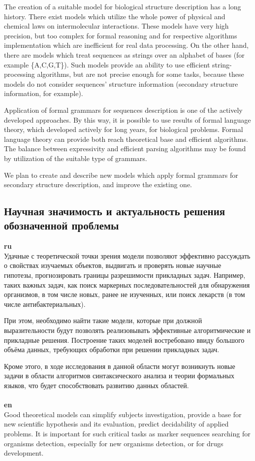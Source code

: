 \documentclass[12pt]{article}  %
\theoremstyle{remark}
\begin{document}
The creation of a suitable model for biological structure description has a long history.
There exist models which utilize the whole power of physical and chemical laws on intermolecular interactions.
These models have very high precision, but too complex for formal reasoning and for respective algorithms implementation which are inefficient for real data processing.
On the other hand, there are models which treat sequences as strings over an alphabet of bases (for example \{A,C,G,T\}).
Such models provide an ability to use efficient string-processing algorithms, but are not precise enough for some tasks, because these models do not consider sequences' structure information (secondary structure information, for example).

Application of formal grammars for sequences description is one of the actively developed approaches.
By this way, it is possible to use results of formal language theory, which developed actively for long years, for biological problems.
Formal language theory can provide both reach theoretical base and efficient algorithms.
The balance between expressivity and efficient parsing algorithms may be found by utilization of the suitable type of grammars.

We plan to create and describe new models which apply formal grammars for secondary structure description, and improve the existing one.

\subsection{Научная значимость и актуальность решения обозначенной проблемы}

\textbf{ru}\\
Удачные с теоретической точки зрения модели позволяют эффективно рассуждать о свойствах изучаемых объектов, выдвигать и проверять новые научные гипотезы, прогнозировать границы разрешимости прикладных задач. Например, таких важных задач, как поиск маркерных последовательностей для обнаружения организмов, в том числе новых, ранее не изученных, или поиск лекарств (в том числе антибактериальных).

При этом, необходимо найти такие модели, которые при должной выразительности будут позволять реализовывать эффективные алгоритмические и прикладные решения.
Построение таких моделей востребовано ввиду большого объёма данных, требующих обработки при решении прикладных задач.

Кроме этого, в ходе исследования в данной области могут возникнуть новые задачи в области алгоритмов синтаксического анализа и теории формальных языков, что будет способствовать развитию данных областей.
\\
\\
\textbf{en}\\
Good theoretical models can simplify subjects investigation, provide a base for new scientific hypothesis and its evaluation, predict decidability of applied problems.
It is important for such critical tasks as marker sequences searching for organisms detection, especially for new organisms detection, or for drugs development.
\end{document}
